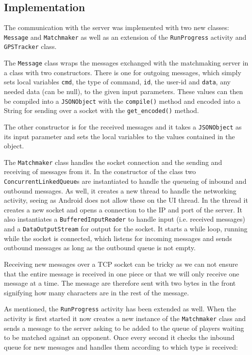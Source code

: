 \subsection{Implementation}
The communication with the server was implemented with two new classes: \texttt{Message} and \texttt{Matchmaker} as well as an extension of the \texttt{RunProgress} activity and \texttt{GPSTracker} class. 

The \texttt{Message} class wraps the messages exchanged with the matchmaking server in a class with two constructors. There is one for outgoing messages, which simply sets local variables \texttt{cmd}, the type of command, \texttt{id}, the user-id and \texttt{data}, any needed data (can be null), to the given input parameters. These values can then be compiled into a \texttt{JSONObject} with the \texttt{compile()} method and encoded into a String for sending over a socket with the \texttt{get\_encoded()} method. 

The other constructor is for the received messages and it takes a \texttt{JSONObject} as its input parameter and sets the local variables to the values contained in the object.
\vspace{10pt}

The \texttt{Matchmaker} class handles the socket connection and the sending and receiving of messages from it. In the constructor of the class two \texttt{ConcurrentLinkedQueue}s are instantiated to handle the queueing of inbound and outbound messages. As well, it creates a new thread to handle the networking activity, seeing as Android does not allow these on the \ac{UI} thread. In the thread it creates a new socket and opens a connection to the \ac{IP} and port of the server. It also instantiates a \texttt{BufferedInputReader} to handle input (i.e. received messages) and a \texttt{DataOutputStream} for output for the socket. It starts a while loop, running while the socket is connected, which listens for incoming messages and sends outbound messages as long as the outbound queue is not empty.

Receiving new messages over a \ac{TCP} socket can be tricky as we can not ensure that the entire message is received in one piece or that we will only receive one message at a time. The message are therefore sent with two bytes in the front signifying how many characters are in the rest of the message.

As mentioned, the \texttt{RunProgress} activity has been extended as well. When the activity is first started it now creates a new instance of the \texttt{Matchmaker} class and sends a message to the server asking to be added to the queue of players waiting to be matched against an opponent. Once every second it checks the inbound queue for new messages and handles them according to which type is received:

